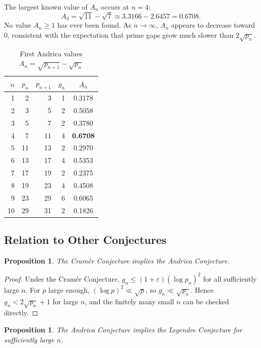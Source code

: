 \documentclass[12pt,a4paper]{amsart}
\newtheorem{proposition}[theorem]{Proposition}
\theoremstyle{definition}
\begin{document}
The largest known value of $A_n$ occurs at $n = 4$:
\[
  A_4 = \sqrt{11} - \sqrt{7} \approx 3.3166 - 2.6457 = 0.6708.
\]
No value $A_n \geq 1$ has ever been found. As $n \to \infty$, $A_n$ appears to
decrease toward $0$, consistent with the expectation that prime gaps grow much
slower than $2\sqrt{p_n}$.

\begin{table}[h]
\centering
\caption{First Andrica values $A_n = \sqrt{p_{n+1}} - \sqrt{p_n}$}
\begin{tabular}{@{}rrrrc@{}}
\toprule
$n$ & $p_n$ & $p_{n+1}$ & $g_n$ & $A_n$ \\
\midrule
1 & 2 & 3 & 1 & 0.3178 \\
2 & 3 & 5 & 2 & 0.5058 \\
3 & 5 & 7 & 2 & 0.3780 \\
4 & 7 & 11 & 4 & \textbf{0.6708} \\
5 & 11 & 13 & 2 & 0.2970 \\
6 & 13 & 17 & 4 & 0.5353 \\
7 & 17 & 19 & 2 & 0.2375 \\
8 & 19 & 23 & 4 & 0.4508 \\
9 & 23 & 29 & 6 & 0.6065 \\
10 & 29 & 31 & 2 & 0.1826 \\
\bottomrule
\end{tabular}
\end{table}

\subsection{Relation to Other Conjectures}

\begin{proposition}
The Cram\'{e}r Conjecture implies the Andrica Conjecture.
\end{proposition}

\begin{proof}
Under the Cram\'{e}r Conjecture, $g_n \leq (1+\varepsilon)(\log p_n)^2$ for all
sufficiently large $n$. For $p$ large enough, $(\log p)^2 \ll \sqrt{p}$, so
$g_n \ll \sqrt{p_n}$. Hence $g_n < 2\sqrt{p_n} + 1$ for large $n$, and the
finitely many small $n$ can be checked directly.
\end{proof}

\begin{proposition}
The Andrica Conjecture implies the Legendre Conjecture for sufficiently large $n$.
\end{proposition}
\end{document}
